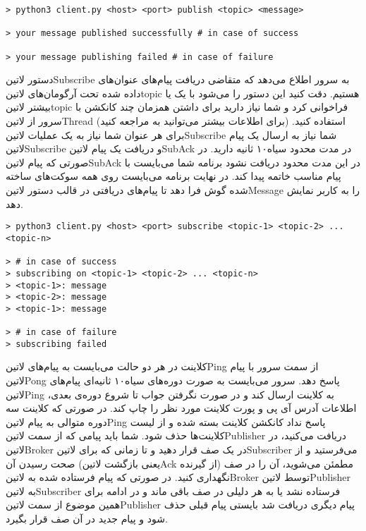 \documentclass[]{../assignment}
\begin{document}
  \begin{latin}
  \begin{verbatim}
> python3 client.py <host> <port> publish <topic> <message>

> your message published successfully # in case of success

> your message publishing failed # in case of failure
  \end{verbatim}
  \end{latin}

  دستور ‌لاتین{Subscribe} به سرور اطلاع می‌دهد که متقاضی دریافت پیام‌های عنوان‌های داده شده تحت آرگومان‌های ‌لاتین{topic} هستیم.
  دقت کنید این دستور را می‌شود با یک یا بیشتر ‌لاتین{topic} فراخوانی کرد و شما نیاز دارید برای داشتن همزمان چند کانکشن با سرور از ‌لاتین{Thread} (برای اطلاعات بیشتر می‌توانید به  مراجعه کنید) استفاده کنید.
  برای هر عنوان شما نیاز به یک عملیات ‌لاتین{Subscribe} شما نیاز به ارسال یک پیام ‌لاتین{Subscribe} و دریافت یک پیام ‌لاتین{SubAck} در مدت محدود ‌سیاه{۱۰ ثانیه} دارید.
  در صورتی که پیام ‌لاتین{SubAck} در این مدت محدود دریافت نشود برنامه شما می‌بایست با پیام مناسب خاتمه پیدا کند.
  در نهایت برنامه می‌بایست روی همه سوکت‌های ساخته شده گوش فرا دهد تا پیام‌های دریافتی در قالب دستور ‌لاتین{Message} را به کاربر نمایش دهد.

  \begin{latin}
  \begin{verbatim}
> python3 client.py <host> <port> subscribe <topic-1> <topic-2> ... <topic-n>

> # in case of success
> subscribing on <topic-1> <topic-2> ... <topic-n>
> <topic-1>: message
> <topic-2>: message
> <topic-1>: message

> # in case of failure
> subscribing failed
  \end{verbatim}
  \end{latin}


   کلاینت در هر دو حالت می‌بایست به پیام‌های ‌لاتین{Ping} از سمت سرور با پیام ‌لاتین{Pong} پاسخ دهد.
   سرور می‌بایست به صورت دوره‌های ‌سیاه{۱۰ ثانیه‌ای} پیام‌های ‌لاتین{Ping} به کلاینت ارسال کند و در صورت نگرفتن جواب تا شروع دوره‌ی بعدی، اطلاعات آدرس آی پی و پورت کلاینت مورد نظر را چاپ کند.
   در صورتی که کلاینت سه دوره متوالی به پیام ‌لاتین{Ping} پاسخ نداد کانکشن کلاینت بسته شده و از لیست کلاینت‌ها حذف شود.
   شما باید پیامی که از سمت ‌لاتین{Publisher} دریافت می‌کنید، در ‌لاتین{Broker} در یک صف قرار دهید و تا زمانی که برای ‌لاتین{Subscriber} می‌فرستید و از صحت رسیدن آن (یعنی بازگشت ‌لاتین{Ack} از گیرنده) مطمئن می‌شوید، آن را در صف نگهداری کنید.
  در صورتی که پیام فرستاده شده به ‌لاتین{Broker} توسط ‌لاتین{Publisher} به ‌لاتین{Subscriber} فرستاده نشد یا به هر دلیلی در صف باقی ماند و در ادامه برای همین موضوع از سمت ‌لاتین{Publisher} پیام دیگری دریافت شد بایستی پیام قبلی حذف شود و پیام جدید در آن صف قرار بگیرد.
\end{document}
